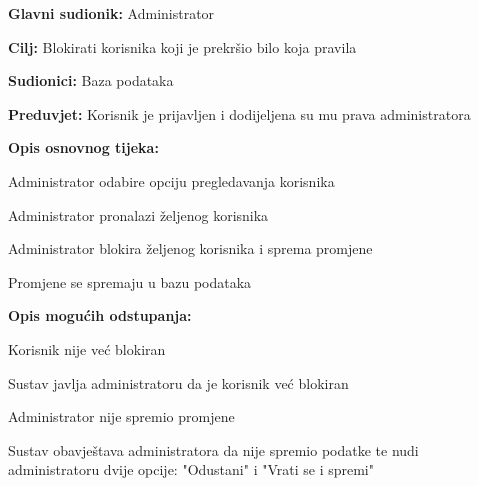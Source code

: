 				\noindent {}
					\begin{packed_item}
	
						\item \textbf{Glavni sudionik: }Administrator
						\item  \textbf{Cilj:} Blokirati korisnika koji je prekršio bilo koja pravila
						\item  \textbf{Sudionici:} Baza podataka
						\item  \textbf{Preduvjet:} Korisnik je prijavljen i dodijeljena su mu prava administratora
						\item  \textbf{Opis osnovnog tijeka:}
						
						\item[] \begin{packed_enum}
	
							\item Administrator odabire opciju pregledavanja korisnika
							\item Administrator pronalazi željenog korisnika
							\item Administrator blokira željenog korisnika i sprema promjene
							\item Promjene se spremaju u bazu podataka

						\end{packed_enum}
						
						\item  \textbf{Opis mogućih odstupanja:}
						
						\item[] \begin{packed_item}
	
							\item[3.a] Korisnik nije već blokiran
								\begin{packed_item}
									\item Sustav javlja administratoru da je korisnik već blokiran
								\end{packed_item} 
							\item[3.b] Administrator nije spremio promjene
								\begin{packed_item}
									\item Sustav obavještava administratora da nije spremio podatke te nudi administratoru dvije opcije: "Odustani" i "Vrati se i spremi"
								\end{packed_item}
							
						\end{packed_item}						
					\end{packed_item}
					
